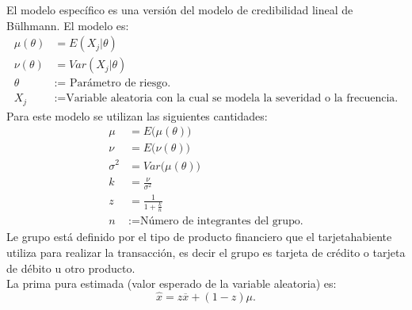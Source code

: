 \documentclass{article}
\begin{document}
El modelo específico es una versión del modelo de credibilidad lineal de Bülhmann. El modelo es:
\begin{align*}
    \mu(\theta) &= E( X_j | \theta) \\
    \nu (\theta) &= Var(X_j | \theta) \\
    \theta &:= \text{ Parámetro de riesgo.} \\
    X_j & := \text{Variable aleatoria con la cual se modela la severidad o la frecuencia.}
\end{align*}
Para este modelo se utilizan las siguientes cantidades: 
\begin{align*}
    \mu &= E \big ( \mu(\theta) \big) \\
    \nu &= E \big ( \nu(\theta) \big) \\
    \sigma^2 &= Var \big ( \mu (\theta) \big ) \\
    k &= \frac{\nu}{\sigma^2} \\
    z &= \frac{1}{1 + \frac{k}{n} } \\
    n & := \text{Número de integrantes del grupo.}
\end{align*}
Le grupo está definido por el tipo de producto financiero que el tarjetahabiente utiliza para realizar la transacción, es decir el grupo es tarjeta de crédito o tarjeta de débito u otro producto. \\
La prima pura estimada (valor  esperado de la variable aleatoria) es: 
\begin{equation*}
    \hat{x} = z \overline{x} + (1 - z ) \mu.
\end{equation*}
\newpage
\end{document}
